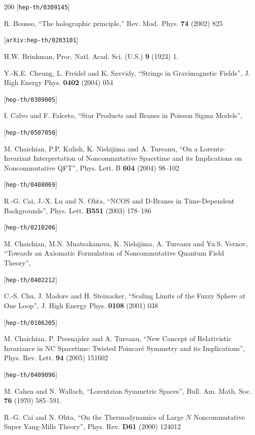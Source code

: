 \begin{thebibliography}{200}
 [{\tt hep-th/0309145}] 

 R. Bousso, ``The holographic principle,'' Rev. Mod.\ Phys. {\bf 74} (2002) 825 

 [{\tt arXiv:hep-th/0203101}] 

 H.W. Brinkman, Proc. Natl. Acad. Sci. (U.S.) {\bf 9} (1923) 1. 

 Y.-K.E. Cheung, L. Freidel and K. Savvidy, ``Strings in Gravimagnetic Fields'', J. High Energy Phys. {\bf 0402} (2004) 054 

 [{\tt hep-th/0309005}] 

 I. Calvo and F. Falceto, ``Star Products and Branes in Poisson Sigma Models'', 

 [{\tt hep-th/0507050}] 

 M. Chaichian, P.P. Kulish, K. Nishijima and A. Tureanu, ``On a Lorentz-Invariant Interpretation of Noncommutative Spacetime and its Implications on Noncommutative QFT'', Phys. Lett. B {\bf 604} (2004) 98--102 

 [{\tt hep-th/0408069}] 

 R.-G. Cai, J.-X. Lu and N. Ohta, ``NCOS and D-Branes in Time-Dependent Backgrounds'', Phys. Lett. {\bf B551} (2003) 178--186 

 [{\tt hep-th/0210206}] 

 M. Chaichian, M.N. Mnatsakanova, K. Nishijima, A. Tureanu and Yu.S. Vernov, ``Towards an Axiomatic Formulation of Noncommutative Quantum Field Theory'', 

 [{\tt hep-th/0402212}] 

 C.-S. Chu, J. Madore and H. Steinacker, ``Scaling Limits of the Fuzzy Sphere at One Loop'', J. High Energy Phys. {\bf 0108} (2001) 038 

 [{\tt hep-th/0106205}] 

 M. Chaichian, P. Presnajder and A. Tureanu, ``New Concept of Relativistic Invariance in NC Spacetime: Twisted Poincar\'e Symmetry and its Implications'', Phys. Rev. Lett. {\bf 94} (2005) 151602 

 [{\tt hep-th/0409096}] 

 M. Cahen and N. Wallach, ``Lorentzian Symmetric Spaces'', Bull. Am. Math. Soc. {\bf 76} (1970) 585--591. 

 R.-G. Cai and N. Ohta, ``On the Thermodynamics of Large $N$ Noncommutative Super Yang-Mills Theory'', Phys. Rev. {\bf D61} (2000) 124012 


\end{thebibliography}
